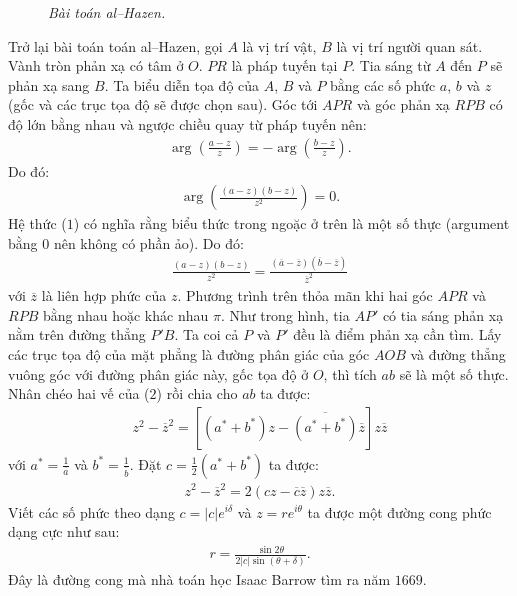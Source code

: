 \begin{multicols}{2}
\begin{figure}[H]
		\caption{\small\textit{\color{lichsutoanhoc}Bài toán al--Hazen.}}
		\vspace*{-10pt}
	\end{figure}
	Trở lại bài toán toán al--Hazen, gọi $A$ là vị trí vật, $B$ là vị trí người quan sát. Vành tròn phản xạ có tâm ở $O$. $PR$ là pháp tuyến tại $P$. Tia sáng từ $A$ đến $P$ sẽ phản xạ sang $B$. Ta biểu diễn tọa độ của $A$, $B$ và $P$ bằng các số phức $a$, $b$ và $z$ (gốc và các trục tọa độ sẽ được chọn sau).
	\vskip 0.1cm
	Góc tới $APR$ và góc phản xạ $RPB$ có độ lớn bằng nhau và ngược chiều quay từ pháp tuyến nên:
	\begin{align*}
		\arg\left(\frac{a-z}{z}\right) = - \arg\left(\frac{b-z}{z}\right).
	\end{align*}
	Do đó:
	\begin{align*}
		\arg\left(\frac{(a-z)(b-z)}{z^2}\right) = 0. \tag{$1$}
	\end{align*}
	Hệ thức ($1$) có nghĩa rằng biểu thức trong ngoặc ở trên là một số thực (argument bằng $0$ nên không có phần ảo). Do đó:
	\begin{align*}
		\frac{(a-z)(b-z)}{z^2} = \frac{(\overline{a}- \overline{z})(\overline{b}- \overline{z})}{\overline{z}^2} \tag{$2$}
	\end{align*}
	với $\overline{z}$ là liên hợp phức của $z$.
	\vskip 0.1cm
	Phương trình trên thỏa mãn khi hai góc $APR$ và $RPB$ bằng nhau hoặc khác nhau $\pi$. Như trong hình, tia $AP'$ có tia sáng phản xạ nằm trên đường thẳng $P'B$. Ta coi cả $P$ và $P'$ đều là điểm phản xạ cần tìm.
	\vskip 0.1cm
	Lấy các trục tọa độ của mặt phẳng là đường phân giác của góc $AOB$ và đường thẳng vuông góc với đường phân giác này, gốc tọa độ ở $O$, thì tích $ab$ sẽ là một số thực. Nhân chéo hai vế của ($2$) rồi chia cho $ab$ ta được:
	\begin{align*}
		z^2 - \overline{z}^2 = \left[(a^*+ b^*)z - \overline{(a^*+b^*)}\overline{z}\right]z\overline{z}
	\end{align*}
	với $a^*=\frac{1}{\overline{a}}$ và  $b^*=\frac{1}{\overline{b}}$. Đặt $c = \frac{1}{2}(a^*+ b^*)$ ta được:
	\begin{align*}
		z^2 - \overline{z}^2 = 2 (cz - \overline{c}\overline{z})z\overline{z}.
	\end{align*}
	Viết các số phức theo dạng $c = |c|e^{i\delta}$ và $z=re^{i\theta}$ ta được một đường cong phức dạng cực như sau:
	\begin{align*}
		r = \frac{\sin2\theta}{2|c|\sin(\theta + \delta)}. \tag{$3$}
	\end{align*}
	Đây là đường cong mà nhà toán học Isaac Barrow tìm ra năm $1669$.

\end{multicols}
